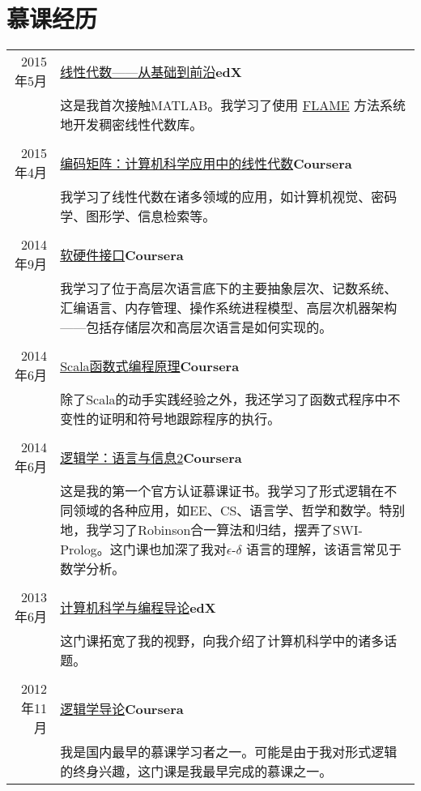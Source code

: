 \documentclass[a4paper,11pt]{article}
\begin{document}
\section{慕课经历}
\begin{tabular}{rp{11.6cm}}
  2015年5月  & \href{https://s3.amazonaws.com/verify.edx.org/downloads/5eb2696ec8874930bb0fda0b8b6756b6/Certificate.pdf}{线性代数——从基础到前沿}\hfill\textbf{edX}\\
             & \footnotesize 这是我首次接触MATLAB。我学习了使用 \href{http://www.cs.utexas.edu/~flame/web/}{FLAME} 方法系统地开发稠密线性代数库。\\&\\
  2015年4月  & \href{https://s3.amazonaws.com/accredible_user_certificate/certificates/144339/original/Coursera_matrix_2015.pdf}{编码矩阵：计算机科学应用中的线性代数}\hfill\textbf{Coursera}\\
             & \footnotesize 我学习了线性代数在诸多领域的应用，如计算机视觉、密码学、图形学、信息检索等。\\&\\
  2014年9月  & \href{https://s3.amazonaws.com/accredible_user_certificate/certificates/53611/original/Coursera_hwswinterface_2014.pdf}{软硬件接口}\hfill\textbf{Coursera}\\
             & \footnotesize 我学习了位于高层次语言底下的主要抽象层次、记数系统、汇编语言、内存管理、操作系统进程模型、高层次机器架构——包括存储层次和高层次语言是如何实现的。\\&\\
  2014年6月  & \href{https://www.coursera.org/account/accomplishments/records/jeAXpfyLDdj7TBYK}{Scala函数式编程原理}\hfill\textbf{Coursera}\\
             & \footnotesize 除了Scala的动手实践经验之外，我还学习了函数式程序中不变性的证明和符号地跟踪程序的执行。\\&\\
  2014年6月  & \href{https://www.coursera.org/account/accomplishments/records/AqU3pfW4qRTd8FzE}{逻辑学：语言与信息2}\hfill\textbf{Coursera}\\
             & \footnotesize 这是我的第一个官方认证慕课证书。我学习了形式逻辑在不同领域的各种应用，如EE、CS、语言学、哲学和数学。特别地，我学习了Robinson合一算法和归结，摆弄了SWI-Prolog。这门课也加深了我对\(\epsilon\textit{-}\delta\) 语言的理解，该语言常见于数学分析。\\&\\
  2013年6月  & \href{https://s3.amazonaws.com/verify.edx.org/downloads/eedec1d10b884139876bee106313142c/Certificate.pdf}{计算机科学与编程导论}\hfill\textbf{edX}\\
             & \footnotesize 这门课拓宽了我的视野，向我介绍了计算机科学中的诸多话题。\\&\\
  2012年11月 & \href{https://s3.amazonaws.com/accredible_user_certificate/certificates/48300/original/IntroLogic.pdf}{逻辑学导论}\hfill\textbf{Coursera}\\
             & \footnotesize 我是国内最早的慕课学习者之一。可能是由于我对形式逻辑的终身兴趣，这门课是我最早完成的慕课之一。
\end{tabular}
\end{document}
